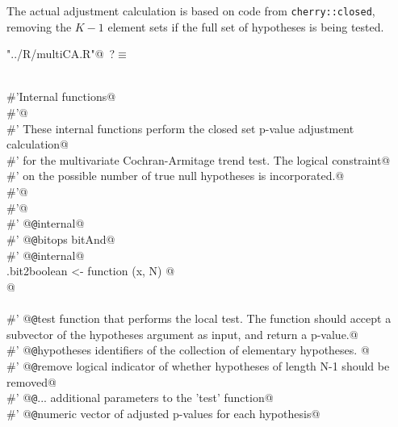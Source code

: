 \documentclass[reqno]{amsart}
\renewcommand{\NWtarget}[2]{\hypertarget{#1}{#2}}
\begin{document}
The actual adjustment calculation is based on code from \texttt{cherry::closed}, removing
the $K-1$ element sets if the full set of hypotheses is being tested.

\begin{flushleft} \small\label{scrap11}\raggedright\small
\NWtarget{nuweb?}{} \verb@"../R/multiCA.R"@\nobreak\ {\footnotesize {?}}$\equiv$
\vspace{-1ex}
\begin{list}{}{} \item
\mbox{}\verb@@\\
\mbox{}\verb@#'Internal functions@\\
\mbox{}\verb@#'@\\
\mbox{}\verb@#' These internal functions perform the closed set p-value adjustment calculation@\\
\mbox{}\verb@#' for the multivariate Cochran-Armitage trend test. The logical constraint@\\
\mbox{}\verb@#' on the possible number of true null hypotheses is incorporated.@\\
\mbox{}\verb@#'@\\
\mbox{}\verb@#'@\\
\mbox{}\verb@#' @{\tt @}\verb@name internal@\\
\mbox{}\verb@#' @{\tt @}\verb@importFrom bitops bitAnd@\\
\mbox{}\verb@#' @{\tt @}\verb@keywords internal@\\
\mbox{}\verb@.bit2boolean <- function (x, N) @\\
\mbox{}@\\
\mbox{}\verb@@\\
\mbox{}\verb@#' @{\tt @}\verb@param test function that performs the local test. The function should accept a subvector of the hypotheses argument as input, and return a p-value.@\\
\mbox{}\verb@#' @{\tt @}\verb@param  hypotheses identifiers of the collection of elementary hypotheses. @\\
\mbox{}\verb@#' @{\tt @}\verb@param remove logical indicator of whether hypotheses of length N-1 should be removed@\\
\mbox{}\verb@#' @{\tt @}\verb@param  ...  additional parameters to the 'test' function@\\
\mbox{}\verb@#' @{\tt @}\verb@return  numeric vector of adjusted p-values for each hypothesis@\\

\end{list}
\end{flushleft}
\end{document}
